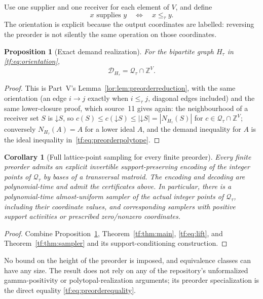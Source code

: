 \documentclass[11pt]{article}
\numberwithin{equation}{section}
\newtheorem{proposition}[theorem]{Proposition}
\newtheorem{corollary}[theorem]{Corollary}
\theoremstyle{definition}
\newcommand{\Z}{\mathbb Z}
\newcommand{\Qt}{\mathcal Q_\tau}
\newcommand{\cD}{\mathcal D}
\begin{document}
Use one supplier and one receiver for each element of $V$, and define
\begin{equation}
 x\text{ supplies }y\quad\Longleftrightarrow\quad x\le_\tau y.
 \label{tf:eq:orientation}
\end{equation}
The orientation is explicit because the output coordinates are labelled:
reversing the preorder is not silently the same operation on those
coordinates.

\begin{proposition}[Exact demand realization]
\label{tf:prop:preorder}
For the bipartite graph $H_\tau$ in \eqref{tf:eq:orientation},
\begin{equation}
 \cD_{H_\tau}=\Qt\cap\Z^V.
 \label{tf:eq:preorderequality}
\end{equation}
\end{proposition}
\begin{proof}
This is Part~V's Lemma~\ref{lor:lem:preorderreduction}, with the same
orientation (an edge $i\to j$ exactly when $i\le_\tau j$, diagonal edges
included) and the same lower-closure proof, which source~11 gives again:
the neighbourhood of a receiver set $S$ is $\mathord\downarrow S$, so
$c(S)\le c(\mathord\downarrow S)\le|\mathord\downarrow S|=|N_{H_\tau}(S)|$
for $c\in\Qt\cap\Z^V$; conversely $N_{H_\tau}(A)=A$ for a lower ideal
$A$, and the demand inequality for $A$ is the ideal inequality
in~\eqref{tf:eq:preorderpolytope}.
\end{proof}

\begin{corollary}[Full lattice-point sampling for every finite preorder]
\label{tf:cor:preordersampler}
Every finite preorder admits an explicit invertible support-preserving
encoding of the integer points of $\Qt$ by bases of a transversal
matroid. The encoding and decoding are polynomial-time and admit the
certificates above. In particular, there is a polynomial-time
almost-uniform sampler of the actual integer points of $\Qt$, including
their coordinate values, and corresponding samplers with positive support
activities or prescribed zero/nonzero coordinates.
\end{corollary}
\begin{proof}
Combine Proposition~\ref{tf:prop:preorder}, Theorem~\ref{tf:thm:main},
\eqref{tf:eq:lift}, and Theorem~\ref{tf:thm:sampler} and its support-conditioning
construction.
\end{proof}

No bound on the height of the preorder is imposed, and equivalence
classes can have any size. The result does not rely on any of the
repository's unformalized gamma-positivity or polytopal-realization
arguments; its preorder specialization is the direct equality
\eqref{tf:eq:preorderequality}.
\end{document}
